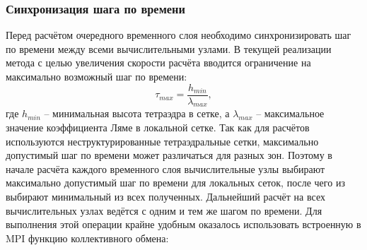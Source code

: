 \subsubsection{Синхронизация шага по времени}
Перед расчётом очередного временного слоя необходимо синхронизировать шаг по времени между всеми вычислительными узлами. В текущей реализации метода с целью увеличения скорости расчёта вводится ограничение на максимально возможный шаг по времени:
\begin{equation}
\label{max_time_step}
\tau_{max}=\frac{h_{min}}{\lambda_{max}},
\end{equation}
где $h_{min}$ -- минимальная высота тетраэдра в сетке, а $\lambda_{max}$ -- максимальное значение коэффициента Ляме в локальной сетке. Так как для расчётов используются неструктурированные тетраэдральные сетки, максимально допустимый шаг по времени может различаться для разных зон. Поэтому в начале расчёта каждого временного слоя вычислительные узлы выбирают максимально допустимый шаг по времени для локальных сеток, после чего из выбирают минимальный из всех полученных. Дальнейший расчёт на всех вычислительных узлах ведётся с одним и тем же шагом по времени. Для выполнения этой операции крайне удобным оказалось использовать встроенную в MPI функцию коллективного обмена:
